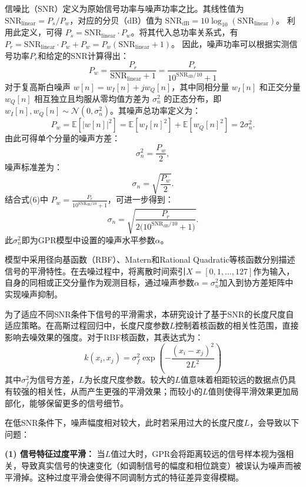 \documentclass[conference]{IEEEtran}
\begin{document}
信噪比（SNR）定义为原始信号功率与噪声功率之比。其线性值为$\mathrm{SNR}_{\text{linear}} = P_s/P_w$，对应的分贝（dB）值为 $\mathrm{SNR}_{\text{dB}} = 10\log_{10}(\mathrm{SNR}_{\text{linear}})$。
利用此定义，可得 $P_s = \mathrm{SNR}_{\text{linear}} \cdot P_w$。将其代入总功率关系式，有 $P_r = \mathrm{SNR}_{\text{linear}} \cdot P_w + P_w = P_w(\mathrm{SNR}_{\text{linear}} + 1)$。
因此，噪声功率可以根据实测信号功率$P_r$和给定的SNR计算得出：
\begin{equation}
P_w = \frac{P_r}{\mathrm{SNR}_{\text{linear}} + 1} = \frac{P_r}{10^{\mathrm{SNR}_{\text{dB}}/10} + 1}
\end{equation}
对于复高斯白噪声 $w[n]=w_I[n]+jw_Q[n]$，其中同相分量 $w_I[n]$ 和正交分量 $w_Q[n]$ 相互独立且均服从零均值方差为 $\sigma_n^2$ 的正态分布，即 $w_I[n],w_Q[n]\sim\mathcal{N}(0,\sigma_n^2)$。其噪声总功率定义为：
\[
P_w=\mathbb{E}[|w[n]|^2]
=\mathbb{E}[w_I[n]^2]+\mathbb{E}[w_Q[n]^2]
=2\sigma_n^2.
\]
由此可得单个分量的噪声方差：
\[
\sigma_n^2=\frac{P_w}{2},
\]
噪声标准差为：
\[
\sigma_n=\sqrt{\frac{P_w}{2}}.
\]
结合式(6)中 $P_w=\frac{P_r}{10^{\mathrm{SNR}_{\mathrm{dB}}/10}+1}$，可进一步得到：
\[
\sigma_n=\sqrt{\frac{P_r}{2\bigl(10^{\mathrm{SNR}_{\mathrm{dB}}/10}+1\bigr)}}.
\]
\label{eq:sigma_n_calc}
此$\sigma_n^2$即为GPR模型中设置的噪声水平参数$\alpha$。

模型中采用径向基函数（RBF）、Matern和Rational Quadratic等核函数分别描述信号的平滑特性。在去噪过程中，将离散时间索引$X=[0,1,\ldots,127]$作为输入，自身的同相或正交分量作为观测目标，通过噪声参数$\alpha=\sigma_n^2$加入到协方差矩阵中实现噪声抑制。

为了适应不同SNR条件下信号的平滑需求，本研究设计了基于SNR的长度尺度自适应策略。在高斯过程回归中，长度尺度参数$L$控制着核函数的相关性范围，直接影响去噪效果的强度。对于RBF核函数，其表达式为：
\begin{equation}
k(x_i, x_j) = \sigma_f^2 \exp\left(-\frac{(x_i - x_j)^2}{2L^2}\right)
\end{equation}
其中$\sigma_f^2$为信号方差，$L$为长度尺度参数。较大的$L$值意味着相距较远的数据点仍具有较强的相关性，从而产生更强的平滑效果；而较小的$L$值则使得平滑效果更加局部化，能够保留更多的信号细节。

在低SNR条件下，噪声幅度相对较大，此时若采用过大的长度尺度$L$，会导致以下问题：

\textbf{(1) 信号特征过度平滑：} 当$L$值过大时，GPR会将距离较远的信号样本视为强相关，导致真实信号的快速变化（如调制信号的幅度和相位跳变）被误认为噪声而被平滑掉。这种过度平滑会使得不同调制方式的特征差异变得模糊。
\end{document}
